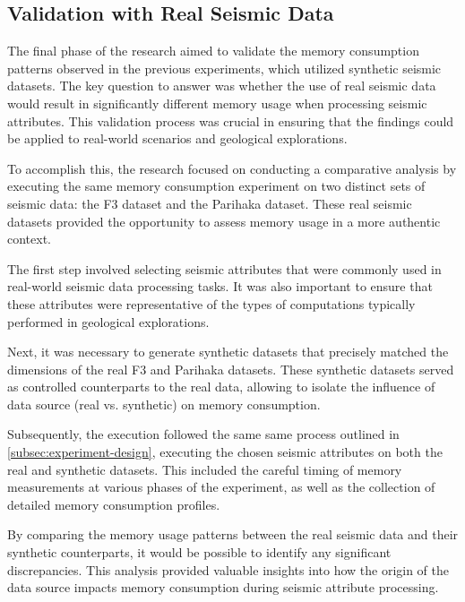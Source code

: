 \subsection{Validation with Real Seismic Data}

The final phase of the research aimed to validate the memory consumption patterns observed in the previous experiments, which utilized synthetic seismic datasets.
The key question to answer was whether the use of real seismic data would result in significantly different memory usage when processing seismic attributes.
This validation process was crucial in ensuring that the findings could be applied to real-world scenarios and geological explorations.

To accomplish this, the research focused on conducting a comparative analysis by executing the same memory consumption experiment on two distinct sets of seismic data: the F3 dataset and the Parihaka dataset.
These real seismic datasets provided the opportunity to assess memory usage in a more authentic context.

The first step involved selecting seismic attributes that were commonly used in real-world seismic data processing tasks.
It was also important to ensure that these attributes were representative of the types of computations typically performed in geological explorations.

Next, it was necessary to generate synthetic datasets that precisely matched the dimensions of the real F3 and Parihaka datasets.
These synthetic datasets served as controlled counterparts to the real data, allowing to isolate the influence of data source (real vs. synthetic) on memory consumption.

Subsequently, the execution followed the same same process outlined in \ref{subsec:experiment-design}, executing the chosen seismic attributes on both the real and synthetic datasets.
This included the careful timing of memory measurements at various phases of the experiment, as well as the collection of detailed memory consumption profiles.

By comparing the memory usage patterns between the real seismic data and their synthetic counterparts, it would be possible to identify any significant discrepancies.
This analysis provided valuable insights into how the origin of the data source impacts memory consumption during seismic attribute processing.

